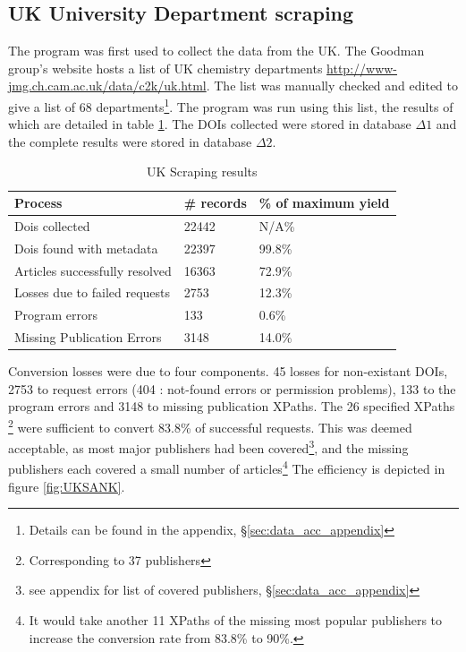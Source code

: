 \subsection{UK University Department scraping}
\label{sec:UKSCRAPE}
The program was first used to collect the data from the UK. The Goodman group's website hosts a list of UK chemistry departments \url{http://www-jmg.ch.cam.ac.uk/data/c2k/uk.html}. The list was manually checked and edited to give a list of 68 departments\footnote{Details can be found in the appendix, \S\ref{sec:data_acc_appendix}}. The program was run using this list, the results of which are detailed in table \ref{tab:UKSCRAPERES}. The DOIs collected were stored in database $\Delta1$ and the complete results were stored in database $\Delta2$.
\begin{table}[h!]
\caption{UK Scraping results}
\label{tab:UKSCRAPERES}
\begin{center}
\begin{tabular}{||l|l|l||}
\hline
Process & \# records & \% of maximum yield\\
\hline
Dois collected & 22442 & N/A\%\\
Dois found with metadata & 22397 & 99.8\%\\
Articles successfully resolved & 16363 & 72.9\%\\
Losses due to failed requests & 2753 & 12.3\%\\
Program errors & 133 & 0.6\%\\
Missing Publication Errors & 3148 & 14.0\% \\
\hline
\end{tabular}
\end{center}
\end{table}
Conversion losses were due to four components. 45 losses for non-existant DOIs, 2753 to request errors (404 : not-found errors or permission problems), 133 to the program errors and 3148 to missing publication XPaths. The 26 specified XPaths \footnote{Corresponding to 37 publishers} were sufficient to convert 83.8\% of successful requests. This was deemed acceptable, as most major publishers had been covered\footnote{see appendix for list of covered publishers, \S\ref{sec:data_acc_appendix}}, and the missing publishers each covered a small number of articles\footnote{It would take another 11 XPaths of the missing most popular publishers to increase the conversion rate from 83.8\% to 90\%.}
The efficiency is depicted in figure \ref{fig:UKSANK}.

